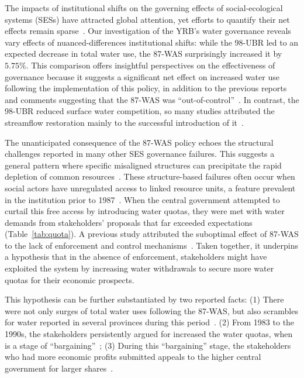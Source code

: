 
The impacts of institutional shifts on the governing effects of social-ecological systems (SESs) have attracted global attention, yet efforts to quantify their net effects remain sparse~\cite{cumming2020a}.
Our investigation of the YRB's water governance reveals vary effects of nuanced-differences institutional shifts: while the 98-UBR led to an expected decrease in total water use, the 87-WAS surprisingly increased it by $5.75\%$.
This comparison offers insightful perspectives on the effectiveness of governance because it suggests a significant net effect on increased water use following the implementation of this policy, in addition to the previous reports and comments suggesting that the 87-WAS was ``out-of-control''~\cite{wang2019d, departmentofearthsciences1999}.
In contrast, the 98-UBR reduced surface water competition, so many studies attributed the streamflow restoration mainly to the successful introduction of it~\cite{chen2021,huangang2002,an2007}.

The unanticipated consequence of the 87-WAS policy echoes the structural challenges reported in many other SES governance failures.
This suggests a general pattern where specific misaligned structures can precipitate the rapid depletion of common resources~\cite{kellenberg2009,cai2016,barnes2019}.
These structure-based failures often occur when social actors have unregulated access to linked resource units, a feature prevalent in the institution prior to 1987~\cite{wang2019c}.
When the central government attempted to curtail this free access by introducing water quotas, they were met with water demands from stakeholders' proposals that far exceeded expectations (Table~\ref{tab:quota}).
A previous study attributed the suboptimal effect of 87-WAS to the lack of enforcement and control mechanisms~\cite{huangang2002}.
Taken together, it underpins a hypothesis that in the absence of enforcement, stakeholders might have exploited the system by increasing water withdrawals to secure more water quotas for their economic prospects.

This hypothesis can be further substantiated by two reported facts:
(1) There were not only surges of total water uses following the 87-WAS, but also scrambles for water reported in several provinces during this period~\cite{mao2000, bouckaert2022}.
(2) From 1983 to the 1990s, the stakeholders persistently argued for increased the water quotas, when is a stage of ``bargaining''~\cite{wang2019e, wang2019d};
(3) During this ``bargaining'' stage, the stakeholders who had more economic profits submitted appeals to the higher central government for larger shares~\cite{wang2019e, wang2019d}.

